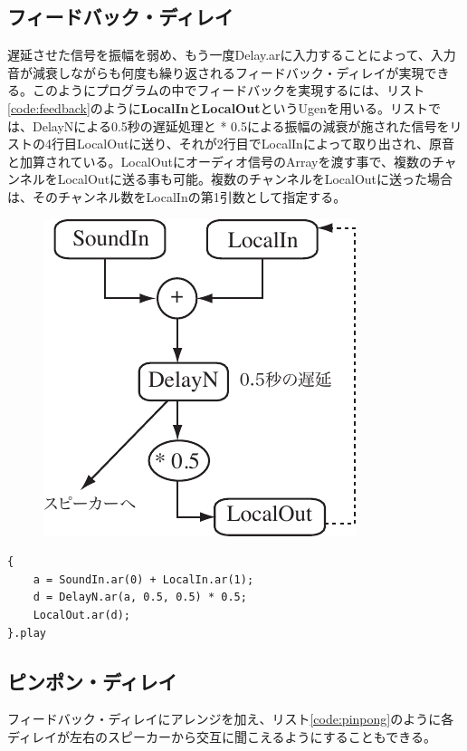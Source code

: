 \documentclass{jsarticle}
\begin{document}
\subsection{フィードバック・ディレイ}
遅延させた信号を振幅を弱め、もう一度Delay.arに入力することによって、入力音が減衰しながらも何度も繰り返されるフィードバック・ディレイが実現できる。このようにプログラムの中でフィードバックを実現するには、リスト\ref{code:feedback}のように{\bf LocalIn}と{\bf LocalOut}というUgenを用いる。リストでは、DelayNによる0.5秒の遅延処理と * 0.5による振幅の減衰が施された信号をリストの4行目LocalOutに送り、それが2行目でLocalInによって取り出され、原音と加算されている。LocalOutにオーディオ信号のArrayを渡す事で、複数のチャンネルをLocalOutに送る事も可能。複数のチャンネルをLocalOutに送った場合は、そのチャンネル数をLocalInの第1引数として指定する。

\begin{figure}[htbp]
	\begin{center}
		\includegraphics[scale=0.7]{feedback.pdf}
	\end{center}
	\label{フィードバック・ディレイの成り立ち}
\end{figure}

\begin{lstlisting}[caption=フィードバック・ディレイ, label=code:feedback]
{
	a = SoundIn.ar(0) + LocalIn.ar(1);
	d = DelayN.ar(a, 0.5, 0.5) * 0.5;
	LocalOut.ar(d);
}.play
\end{lstlisting}

\subsection{ピンポン・ディレイ}
フィードバック・ディレイにアレンジを加え、リスト\ref{code:pinpong}のように各ディレイが左右のスピーカーから交互に聞こえるようにすることもできる。
\end{document}
